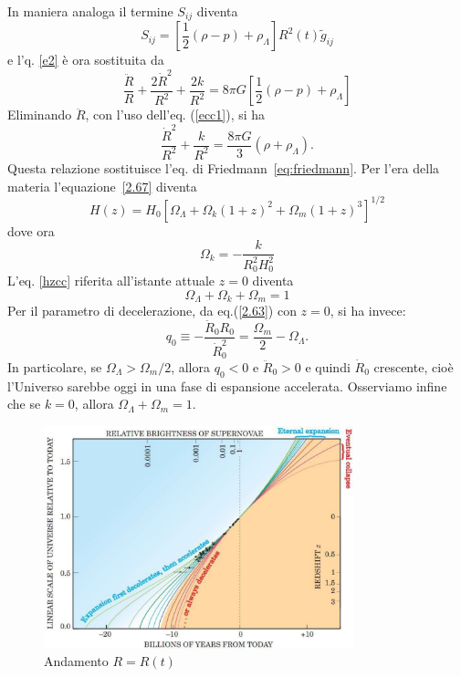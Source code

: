 In maniera analoga il termine $S_{ij}$ diventa
\begin{equation}
  S_{ij}= \left[ \frac {1}{2}(\rho-p)  + \rho_{\Lambda} \right] R^2(t)
  \tilde{g}_{ij}
  \label{sijcc}
\end{equation}
e l'q. \eqref{e2}  è ora sostituita da
\begin{equation}
  \frac {\ddot{R}}{R}+\frac{2\dot{R}^2}{R^2}+\frac{2k}{R^2}=
  8 \pi G \left[ \frac{1}{2}(\rho-p) +\rho_{\Lambda} \right]
\end{equation}
Eliminando $\ddot R$, con l'uso dell'eq. (\ref{ecc1}), si ha
\begin{equation}
  \frac{\dot{R}^2}{R^2} +\frac{k}{R^2} = \frac{8 \pi G}{3} (\rho+\rho_{\Lambda}).
\label{2.67}
\end{equation}
Questa relazione sostituisce l'eq. di Friedmann~\eqref{eq:friedmann}.  Per l'era
della materia l'equazione~\eqref{2.67} diventa
\begin{equation}
  H(z)=H_0\left[\Omega_{\Lambda}+\Omega_{k}(1+z)^2+\Omega_m (1+z)^3\right]^{1/2}
  \label{hzcc}
\end{equation}
dove ora
\begin{equation}
  \Omega_k = - \frac {k}{R_0^2 H_0^2}
\end{equation}
L'eq. \ref{hzcc} riferita all'istante attuale $z=0$ diventa
\begin{equation}
  \Omega_{\Lambda}+\Omega_{k}+\Omega_m = 1
\end{equation}
Per il parametro di decelerazione, da eq.(\ref{2.63}) con $z=0$, si ha invece:
\begin{equation}
  q_0 \equiv  -\frac {\ddot R_0 R_0}{\dot R^2_0} = \frac{\Omega_m}{2}
  -\Omega_{\Lambda}.
  \label{q0cc}
\end{equation}
In particolare, se $\Omega_{\Lambda} > \Omega_m/2$, allora $q_0<0$ e
$\ddot{R}_0>0$ e quindi $\dot{R}_0$ crescente, cioè l'Universo sarebbe oggi in
una fase di espansione accelerata.  Osserviamo infine che se $k=0$, allora
$\Omega_{\Lambda} + \Omega_m = 1$.
\begin{figure}
  \centering{}
  \includegraphics[width=0.8\textwidth]{figure/Scale_Factor_vs-Time.pdf}
  \caption{Andamento $R=R(t)$}
  \label{fig:Rvst}
\end{figure}

